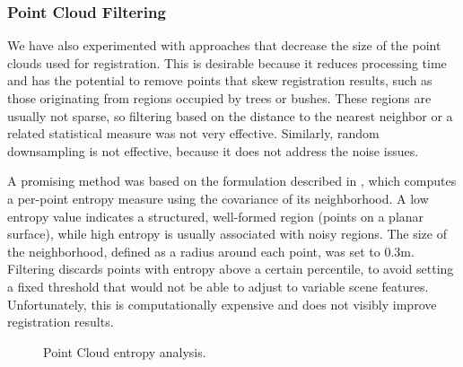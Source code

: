 \subsubsection{Point Cloud Filtering}

We have also experimented with approaches that decrease the size of the point clouds used for registration. This is desirable because it reduces processing time and has the potential to remove points that skew registration results, such as those originating from regions occupied by trees or bushes. These regions are usually not sparse, so filtering based on the distance to the nearest neighbor or a related statistical measure was not very effective.
Similarly, random downsampling is not effective, because it does not address the noise issues.

A promising method was based on the formulation described in \cite{adolfsson2021coral}, which computes a per-point entropy measure using the covariance of its neighborhood.
A low entropy value indicates a structured, well-formed region (\eg points on a planar surface), while high entropy is usually associated with noisy regions. 
The size of the neighborhood, defined as a radius around each point, was set to 0.3m.
Filtering discards points with entropy above a certain percentile, to avoid setting a fixed threshold that would not be able to adjust to variable scene features.  Unfortunately, this is computationally expensive and does not visibly improve registration results.

\begin{figure}
	\centering
	\hfill
	\caption[Filtering using entropy]{Point Cloud entropy analysis.}
	\label{fig:entropy-analysis}
\end{figure}

